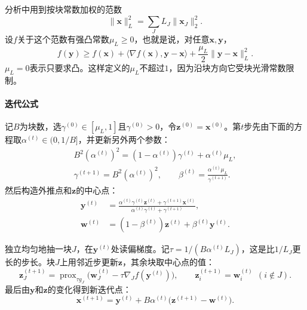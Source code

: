分析中用到按块常数加权的范数
\begin{equation}
 \lVert\bm{x}\rVert_L^2=\sum_{J}L_J\lVert\bm{x}_J\rVert_2^2 .
 \label{eq:block-L-norm}
\end{equation}
设$f$关于这个范数有强凸常数$\mu_L\geq0$，也就是说，对任意$\bm{x},\bm{y}$，
\[
 f(\bm{y})\geq f(\bm{x})+\langle\nabla f(\bm{x}),\bm{y}-\bm{x}\rangle+\frac{\mu_L}{2}\lVert\bm{y}-\bm{x}\rVert_L^2 .
\]
$\mu_L=0$表示只要求凸。这样定义的$\mu_L$不超过$1$，因为沿块方向它受块光滑常数限制。

\paragraph{迭代公式}
记$B$为块数，选$\gamma^{(0)}\in[\mu_L,1]$且$\gamma^{(0)}>0$，令$\bm{z}^{(0)}=\bm{x}^{(0)}$。第$t$步先由下面的方程取$\alpha^{(t)}\in(0,1/B]$，并更新另外两个参数：
\begin{equation}
 \begin{gathered}
 B^2(\alpha^{(t)})^2=(1-\alpha^{(t)})\gamma^{(t)}+\alpha^{(t)}\mu_L,\\
 \gamma^{(t+1)}=B^2(\alpha^{(t)})^2,\qquad
 \beta^{(t)}=\frac{\alpha^{(t)}\mu_L}{\gamma^{(t+1)}} .
 \end{gathered}
 \label{eq:block-apcg-params}
\end{equation}
然后构造外推点和$\bm{z}$的中心点：
\begin{equation}
 \begin{aligned}
 \bm{y}^{(t)}&=\frac{\alpha^{(t)}\gamma^{(t)}\bm{z}^{(t)}+\gamma^{(t+1)}\bm{x}^{(t)}}{\alpha^{(t)}\gamma^{(t)}+\gamma^{(t+1)}},\\
 \bm{w}^{(t)}&=(1-\beta^{(t)})\bm{z}^{(t)}+\beta^{(t)}\bm{y}^{(t)} .
 \end{aligned}
 \label{eq:block-apcg-extrapolate}
\end{equation}

独立均匀地抽一块$J$，在$\bm{y}^{(t)}$处读偏梯度。记$\tau=1/(B\alpha^{(t)}L_J)$，这是比$1/L_J$更长的步长。块$J$上用邻近步更新$\bm{z}$，其余块取中心点的值：
\begin{equation}
 \bm{z}_J^{(t+1)}=\operatorname{prox}_{\tau g_J}\bigl(\bm{w}_J^{(t)}-\tau\nabla_Jf(\bm{y}^{(t)})\bigr),\qquad
 \bm{z}_i^{(t+1)}=\bm{w}_i^{(t)}\ \ (i\notin J).
 \label{eq:block-apcg-z}
\end{equation}
最后由$\bm{y}$和$\bm{z}$的变化得到新迭代点：
\begin{equation}
 \bm{x}^{(t+1)}=\bm{y}^{(t)}+B\alpha^{(t)}\bigl(\bm{z}^{(t+1)}-\bm{w}^{(t)}\bigr).
 \label{eq:block-apcg-x}
\end{equation}


